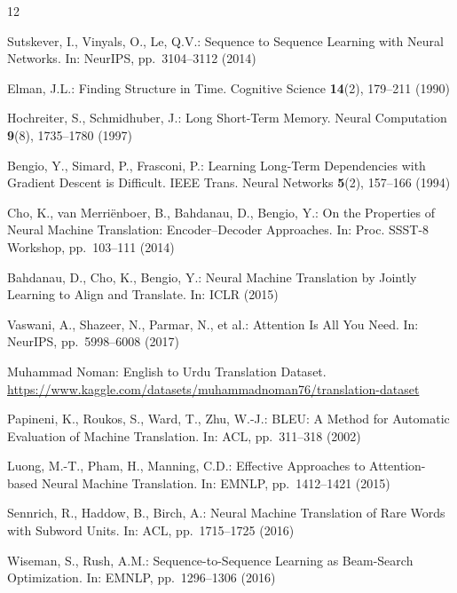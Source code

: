 \documentclass[runningheads]{llncs}
\begin{document}
\begin{thebibliography}{12}

Sutskever, I., Vinyals, O., Le, Q.V.:
Sequence to Sequence Learning with Neural Networks.
In: NeurIPS, pp.~3104--3112 (2014)

Elman, J.L.:
Finding Structure in Time.
Cognitive Science \textbf{14}(2), 179--211 (1990)

Hochreiter, S., Schmidhuber, J.:
Long Short-Term Memory.
Neural Computation \textbf{9}(8), 1735--1780 (1997)

Bengio, Y., Simard, P., Frasconi, P.:
Learning Long-Term Dependencies with Gradient Descent is Difficult.
IEEE Trans. Neural Networks \textbf{5}(2), 157--166 (1994)

Cho, K., van Merri\"enboer, B., Bahdanau, D., Bengio, Y.:
On the Properties of Neural Machine Translation: Encoder--Decoder Approaches.
In: Proc. SSST-8 Workshop, pp.~103--111 (2014)

Bahdanau, D., Cho, K., Bengio, Y.:
Neural Machine Translation by Jointly Learning to Align and Translate.
In: ICLR (2015)

Vaswani, A., Shazeer, N., Parmar, N., et al.:
Attention Is All You Need.
In: NeurIPS, pp.~5998--6008 (2017)

Muhammad Noman:
English to Urdu Translation Dataset.
\url{https://www.kaggle.com/datasets/muhammadnoman76/translation-dataset}

Papineni, K., Roukos, S., Ward, T., Zhu, W.-J.:
BLEU: A Method for Automatic Evaluation of Machine Translation.
In: ACL, pp.~311--318 (2002)

Luong, M.-T., Pham, H., Manning, C.D.:
Effective Approaches to Attention-based Neural Machine Translation.
In: EMNLP, pp.~1412--1421 (2015)

Sennrich, R., Haddow, B., Birch, A.:
Neural Machine Translation of Rare Words with Subword Units.
In: ACL, pp.~1715--1725 (2016)

Wiseman, S., Rush, A.M.:
Sequence-to-Sequence Learning as Beam-Search Optimization.
In: EMNLP, pp.~1296--1306 (2016)

\end{thebibliography}
\end{document}
